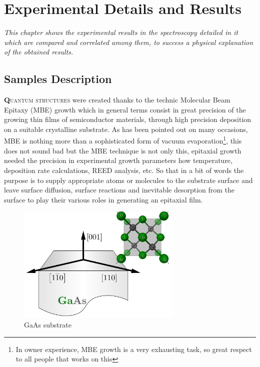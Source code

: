 \chapter{Experimental Details and Results}
\label{chap:experimentals-details-and-results}
\textit{This chapter shows the experimental results in the spectroscopy detailed in it which are compared and correlated among them, to success a physical explanation of the obtained results.}
\vfill
\minitoc
\newpage

\section{Samples Description}
\label{sec:chapter-3-section-samples-description}
\vspace{-10mm}
\lettrine[lines=3, lraise=.1, nindent=0mm, slope=0mm]{\textbf{Q}}{uantum structures} were created thanks to the technic Molecular Beam Epitaxy (MBE) growth which in general terms consist in great precision of the growing thin films of semiconductor materials, through high precision  deposition on a suitable  crystalline substrate. As has been pointed out on many occasions, MBE  is nothing more than a sophisticated form of vacuum evaporation\footnote{In owner  experience, MBE growth is a very exhausting task, so great respect to all people that works on this}\cite{orton2015molecular}, this does not sound bad but the MBE technique is not only this, epitaxial growth needed  the precision in experimental  growth parameters how temperature, deposition rate calculations, REED analysis, etc. So that in a bit of words the purpose is to  supply appropriate atoms or molecules to the substrate surface and leave surface diffusion, surface reactions and inevitable desorption from the surface to play their various roles in generating an epitaxial film\cite{orton2015molecular,grundmann2010physics}. 

\begin{figure}[H]
	\centering
	\includegraphics[width=0.7\textwidth]{../figures/chapter-3/crystal-1/build/crystal-1.pdf}
	\caption[GaAs substrate growth direction]{GaAs substrate}
	\label{fig:chapter-3 GaAs Substrate}
\end{figure}

